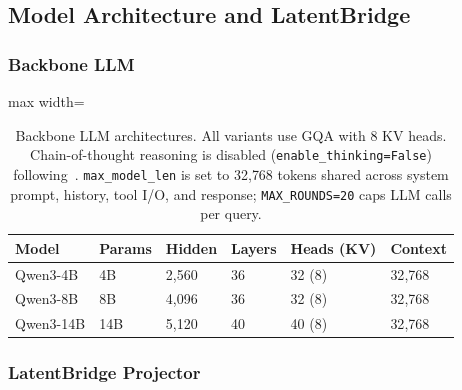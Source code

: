 \subsection{Model Architecture and LatentBridge}
\label{sec:app_architecture}

\subsubsection{Backbone LLM}
\label{sec:app_backbone}

\begin{table}[h]
\centering
\small
\begin{adjustbox}{max width=\columnwidth}
\begin{tabular}{llllll}
\toprule
\textbf{Model} & \textbf{Params} & \textbf{Hidden} & \textbf{Layers} & \textbf{Heads (KV)} & \textbf{Context} \\
\midrule
Qwen3-4B  & 4B  & 2{,}560 & 36 & 32 (8) & 32{,}768 \\
Qwen3-8B  & 8B  & 4{,}096 & 36 & 32 (8) & 32{,}768 \\
Qwen3-14B & 14B & 5{,}120 & 40 & 40 (8) & 32{,}768 \\
\bottomrule
\end{tabular}
\end{adjustbox}
\vspace{2mm}\caption{Backbone LLM architectures. All variants use GQA with 8 KV heads. Chain-of-thought reasoning is disabled (\texttt{enable\_thinking=False}) following~\cite{yang2025qwen3}.
\texttt{max\_model\_len} is set to 32{,}768 tokens shared across system prompt, history, tool I/O, and response; \texttt{MAX\_ROUNDS=20} caps LLM calls per query.}
\label{tab:backbone}
\end{table}



\subsubsection{LatentBridge Projector}
\label{sec:app_projector}

